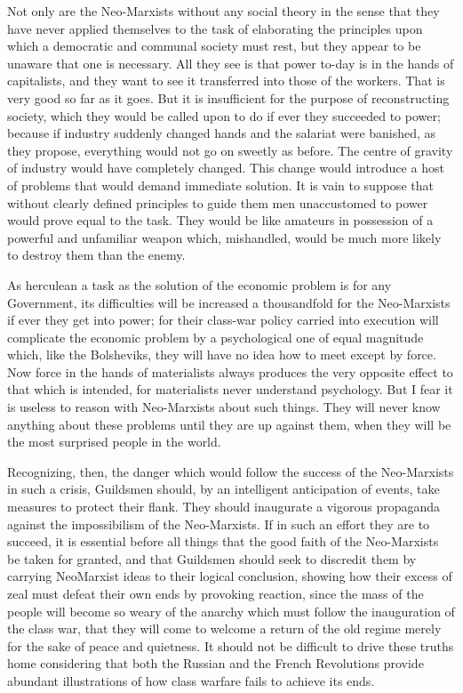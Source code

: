 \documentclass{book}
\begin{document}
Not only are the Neo-Marxists without any social theory in the sense that they have never applied themselves to the task of elaborating the principles upon which a democratic and communal society must rest, but they appear to be unaware that one is necessary. All they see is that power to-day is in the hands of capitalists, and they want to see it transferred into those of the workers. That is very good so far as it goes. But it is insufficient for the purpose of reconstructing society, which they would be called upon to do if ever they succeeded to power; because if industry suddenly changed hands and the salariat were banished, as they propose, everything would not go on sweetly as before. The centre of gravity of industry would have completely changed. This change would introduce a host of problems that would demand immediate solution. It is vain to suppose that without clearly defined principles to guide them men unaccustomed to power would prove equal to the task. They would be like amateurs in possession of a powerful and unfamiliar weapon which, mishandled, would be much more likely to destroy them than the enemy.

As herculean a task as the solution of the economic problem is for any Government, its difficulties will be increased a thousandfold for the Neo-Marxists if ever they get into power; for their class-war policy carried into execution will complicate the economic problem by a psychological one of equal magnitude which, like the Bolsheviks, they will have no idea how to meet except by force. Now force in the hands of materialists always produces the very opposite effect to that which is intended, for materialists never understand psychology. But I fear it is useless to reason with Neo-Marxists about such things. They will never know anything about these problems until they are up against them, when they will be the most surprised people in the world.

Recognizing, then, the danger which would follow the success of the Neo-Marxists in such a crisis, Guildsmen should, by an intelligent anticipation of events, take measures to protect their flank. They should inaugurate a vigorous propaganda against the impossibilism of the Neo-Marxists. If in such an effort they are to succeed, it is essential before all things that the good faith of the Neo-Marxists be taken for granted, and that Guildsmen should seek to discredit them by carrying NeoMarxist ideas to their logical conclusion, showing how their excess of zeal must defeat their own ends by provoking reaction, since the mass of the people will become so weary of the anarchy which must follow the inauguration of the class war, that they will come to welcome a return of the old regime merely for the sake of peace and quietness. It should not be difficult to drive these truths home considering that both the Russian and the French Revolutions provide abundant illustrations of how class warfare fails to achieve its ends.
\end{document}
